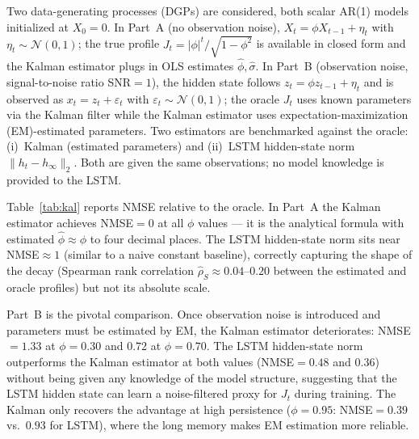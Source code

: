 \documentclass[bj,authoryear]{imsart}
\theoremstyle{plain}
\theoremstyle{definition}
\begin{document}
Two data-generating processes (DGPs) are considered, both scalar AR(1) models initialized at $X_0 = 0$.
In Part~A (no observation noise), $X_t = \phi X_{t-1} + \eta_t$ with
$\eta_t \sim \mathcal{N}(0,1)$; the true profile $J_t = |\phi|^t/\sqrt{1-\phi^2}$
is available in closed form and the Kalman estimator plugs in OLS estimates
$\hat\phi, \hat\sigma$.  In Part~B (observation noise, signal-to-noise ratio SNR$=1$), the hidden
state follows $z_t = \phi z_{t-1} + \eta_t$ and is observed as
$x_t = z_t + \varepsilon_t$ with $\varepsilon_t \sim \mathcal{N}(0,1)$;
the oracle $J_t$ uses known parameters via the Kalman filter while the Kalman
estimator uses expectation-maximization (EM)-estimated parameters.
Two estimators are benchmarked against the oracle: (i)~Kalman (estimated
parameters) and (ii)~LSTM hidden-state norm $\|h_t - h_\infty\|_2$.
Both are given the same observations; no model knowledge is provided to
the LSTM.

Table~\ref{tab:kal} reports NMSE relative to the oracle.
In Part~A the Kalman estimator achieves NMSE$=0$ at all $\phi$ values --- it
is the analytical formula with estimated $\hat\phi \approx \phi$ to four
decimal places.  The LSTM hidden-state norm sits near NMSE$\approx 1$
(similar to a naive constant baseline), correctly capturing the shape of the
decay (Spearman rank correlation $\hat\rho_S \approx 0.04$--$0.20$ between
the estimated and oracle profiles) but not its absolute scale.

Part~B is the pivotal comparison.  Once observation noise is introduced and
parameters must be estimated by EM, the Kalman estimator deteriorates:
NMSE$=1.33$ at $\phi=0.30$ and $0.72$ at $\phi=0.70$.  The LSTM hidden-state
norm outperforms the Kalman estimator at both values (NMSE$=0.48$ and $0.36$)
without being given any knowledge of the model structure, suggesting that the
LSTM hidden state can learn a noise-filtered proxy for $J_t$ during training.
The Kalman only recovers the advantage at high persistence ($\phi=0.95$:
NMSE$=0.39$ vs.\ $0.93$ for LSTM), where the long memory makes EM estimation
more reliable.
\end{document}
